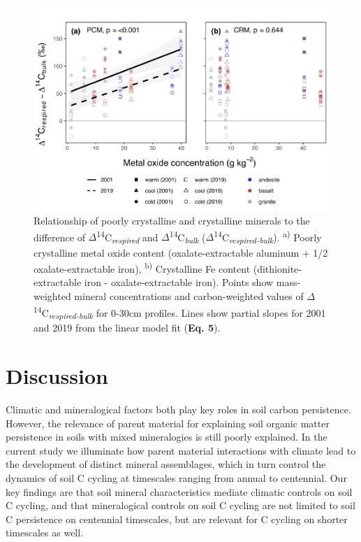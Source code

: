 \documentclass[english,man,floatsintext]{apa6}
\begin{document}
\begin{figure}

{\centering \includegraphics{sra-blk-inc-19_files/figure-latex/plot-min-14c-0-30-blk-inc-1} 

}

\caption{Relationship of poorly crystalline and crystalline minerals to the difference of \(\Delta\)\textsuperscript{14}C\textsubscript{\emph{respired}} and \(\Delta\)\textsuperscript{14}C\textsubscript{\emph{bulk}} (\(\Delta\)\textsuperscript{14}C\textsubscript{\emph{respired-bulk}}). \textsuperscript{a)} Poorly crystalline metal oxide content (oxalate-extractable aluminum + 1/2 oxalate-extractable iron), \textsuperscript{b)} Crystalline Fe content (dithionite-extractable iron - oxalate-extractable iron). Points show mass-weighted mineral concentrations and carbon-weighted values of \(\Delta\)\textsuperscript{14}C\textsubscript{\emph{respired-bulk}} for 0-30cm profiles. Lines show partial slopes for 2001 and 2019 from the linear model fit (\textbf{Eq. 5}).}\label{fig:plot-min-14c-0-30-blk-inc}
\end{figure}

\hypertarget{discussion}{%
\section{Discussion}\label{discussion}}

Climatic and mineralogical factors both play key roles in soil carbon persistence. However, the relevance of parent material for explaining soil organic matter persistence in soils with mixed mineralogies is still poorly explained. In the current study we illuminate how parent material interactions with climate lead to the development of distinct mineral assemblages, which in turn control the dynamics of soil C cycling at timescales ranging from annual to centennial. Our key findings are that soil mineral characteristics mediate climatic controls on soil C cycling, and that mineralogical controls on soil C cycling are not limited to soil C persistence on centennial timescales, but are relevant for C cycling on shorter timescales as well.
\end{document}
